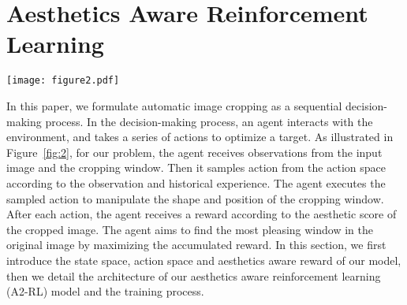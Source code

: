 \documentclass[10pt,twocolumn,letterpaper]{article}
\begin{document}
\section{Aesthetics Aware Reinforcement Learning}
\begin{figure*}
\begin{center}
\texttt{[image: figure2.pdf]}
\end{center}
\caption{Illustration of the A2-RL model architecture. In the forward pass, the feature of the cropping window (local feature) is extracted and concatenated with the feature of the whole image (global feature) which is extracted and retained previously. Then, the concatenated feature vector is fed into the actor-critic branch which has two outputs. The actor output is used to sample actions from the action space so as to manipulate the cropping window. The critic output (state value) is used to estimate the expected reward under the current state. In addition, the feature of the cropping window is also fed into the aesthetic quality assessment branch. The output of this branch is the aesthetic score of the input cropping window and stored to compute rewards for actions. In this model, both the global feature and the local feature are 1000-dim vectors, three fully-connected layers and the LSTM layer all output 1024-dim feature vectors.}

\label{fig:2}
\end{figure*}
In this paper, we formulate automatic image cropping as a sequential decision-making process. In the decision-making process, an agent interacts with the environment, and takes a series of actions to optimize a target. As illustrated in Figure~\ref{fig:2}, for our problem, the agent receives observations from the input image and the cropping window. Then it samples action from the action space according to the observation and historical experience. The agent executes the sampled action to manipulate the shape and position of the cropping window. After each action, the agent receives a reward according to the aesthetic score of the cropped image. The agent aims to find the most pleasing window in the original image by maximizing the accumulated reward. In this section, we first introduce the state space, action space and aesthetics aware reward of our model, then we detail the architecture of our aesthetics aware reinforcement learning (A2-RL) model and the training process.
\end{document}
